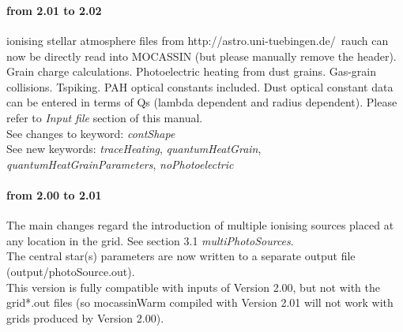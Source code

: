 \documentclass[11pt]{article}
\begin{document}
\pagebreak

\\
\\
\paragraph {from 2.01 to 2.02}  ionising stellar atmosphere files from  http://astro.uni-tuebingen.de/~rauch can now be directly read into MOCASSIN (but please manually remove the header). Grain charge calculations. Photoelectric heating from dust grains. Gas-grain collisions. Tspiking. 
PAH optical constants included. Dust optical constant data can be entered in terms of Qs (lambda dependent and radius dependent).
Please refer to {\it Input file} section of this manual. \\
See changes to keyword: {\it contShape}\\
See new keywords: {\it traceHeating}, {\it quantumHeatGrain}, {\it quantumHeatGrainParameters}, 
{\it noPhotoelectric}
\\
\paragraph {from 2.00 to 2.01} The main changes regard the introduction of multiple ionising sources placed at any 
location in the grid. See section 3.1 {\it multiPhotoSources}. \\
The central star(s) parameters are now written to a separate output file (output/photoSource.out). \\
This version is fully compatible with inputs of Version 2.00, but not with the grid*.out files (so mocassinWarm compiled with Version 2.01 will not work with grids produced by Version 2.00).\\
\end{document}

